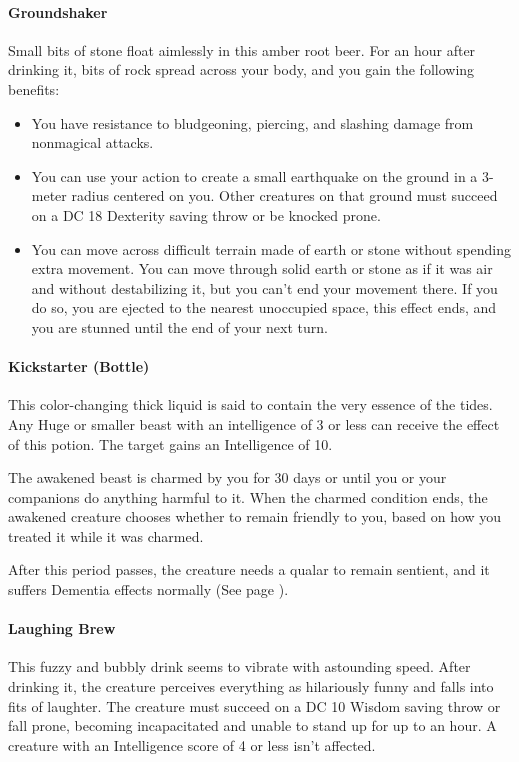     \paragraph{Groundshaker} %
        Small bits of stone float aimlessly in this amber root beer.
        For an hour after drinking it, bits of rock spread across your body, and you gain the following benefits:
        \begin{itemize}
            \item You have resistance to bludgeoning, piercing, and slashing damage from nonmagical attacks.
            \item You can use your action to create a small earthquake on the ground in a 3-meter radius centered on you.
            Other creatures on that ground must succeed on a DC 18 Dexterity saving throw or be knocked prone.
            \item You can move across difficult terrain made of earth or stone without spending extra movement.
            You can move through solid earth or stone as if it was air and without destabilizing it, but you can't end your movement there.
            If you do so, you are ejected to the nearest unoccupied space, this effect ends, and you are stunned until the end of your next turn.
        \end{itemize}
    \paragraph{Kickstarter (Bottle)} %
        This color-changing thick liquid is said to contain the very essence of the tides.
        Any Huge or smaller beast with an intelligence of 3 or less can receive the effect of this potion.
        The target gains an Intelligence of 10.

        The awakened beast is charmed by you for 30 days or until you or your companions do anything harmful to it.
        When the charmed condition ends, the awakened creature chooses whether to remain friendly to you, based on how you treated it while it was charmed.

        After this period passes, the creature needs a qualar to remain sentient, and it suffers Dementia effects normally (See page \pageref{ssec::dementia}).
    \paragraph{Laughing Brew} %
        This fuzzy and bubbly drink seems to vibrate with astounding speed.
        After drinking it, the creature perceives everything as hilariously funny and falls into fits of laughter.
        The creature must succeed on a DC 10 Wisdom saving throw or fall prone, becoming incapacitated and unable to stand up for up to an hour.
        A creature with an Intelligence score of 4 or less isn't affected.

